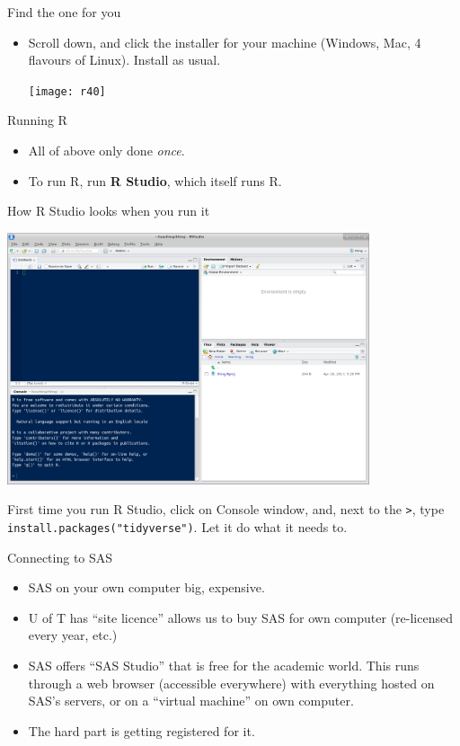 \documentclass[unknownkeysallowed]{beamer}\usepackage[]{graphicx}\usepackage[]{color}
\begin{document}
\begin{frame}[fragile]{Find the one for you}
  
  \begin{itemize}
  \item Scroll down, and click the installer for your machine
    (Windows, Mac, 4 flavours of Linux). Install as usual.
    
    \texttt{[image: r40]}
  \end{itemize}
  
\end{frame}


\begin{frame}[fragile]{Running R}
  
  \begin{itemize}
  \item All of above only done \emph{once}.
  \item To run R, run \textbf{R Studio}, which itself runs R.
  \end{itemize}
  
\end{frame}

\begin{frame}[fragile]{How R Studio looks when you run it}
  
\includegraphics[width=0.8\textwidth]{rstudio-startup}
  
First time you run R Studio, click on Console window, and, next to the
\texttt{>}, type \texttt{install.packages("tidyverse")}. Let it do
what it needs to.
\end{frame}


\begin{frame}[fragile]{Connecting to SAS}

  \begin{itemize}
  \item SAS on your own computer big, expensive.
  \item U of T has ``site licence'' allows us to buy SAS for own
    computer (re-licensed every year, etc.)
  \item SAS offers ``SAS Studio'' that is free for the academic
    world. This runs through a web browser (accessible everywhere)
    with everything hosted on SAS's servers, or on a ``virtual
    machine'' on own computer.
  \item The hard part is getting registered for it.
  \end{itemize}
  
\end{frame}
\end{document}
